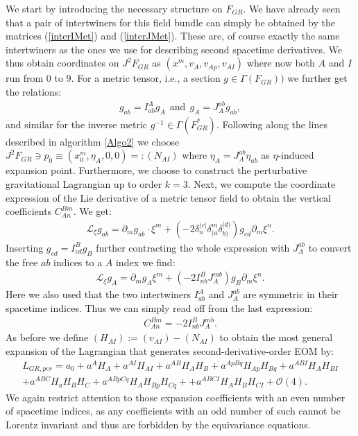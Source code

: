 We start by introducing the necessary structure on $F_{GR}$. We have already seen that a pair of intertwiners for this field bundle can simply be obtained by the matrices  (\ref{interIMet}) and (\ref{interJMet}). These are, of course exactly the same intertwiners as the ones we use for describing second spacetime derivatives. We thus obtain coordinates on $J^2F_{GR}$ as $(x^m,v_A,v_{Ap},v_{AI})$ where now both $A$ and $I$ run from 0 to 9. For a metric tensor, i.e., a section $g \in \Gamma(F_{GR}))$ we further get the relations:
\begin{align}
    g_{ab} = I^A _{ab} g_A \ \ \text{and} \ \ g_A = J^{ab}_{A} g_{ab},
\end{align}
and similar for the inverse metric $g^{-1} \in \Gamma(F_{GR}^{\ast})$.
Following along the lines described in algorithm \ref{Algo2} we choose $J^2F_{GR} \ni p_0 \equiv (x_0^m,\eta_A,0,0) =: (N_{AI})$ where $\eta_A = J^{ab}_A \eta_{ab}$ as $\eta$-induced expansion point. Furthermore, we choose to construct the perturbative gravitational Lagrangian up to order $k=3$. 
Next, we compute the coordinate expression of the Lie derivative of a metric tensor field to obtain the vertical coefficients $C_{An}^{Bm}$. We get:
\begin{align}
    \mathcal{L}_{\xi} g_{ab} = \partial_m g_{ab} \cdot \xi^m + \left (-2 \delta_n^{(c\vert} \delta_{(a}^m \delta_{b)}^{\vert d)} \right ) g_{cd} \partial_m \xi^n.
\end{align}
Inserting $g_{cd} = I^B_{cd} g_B$ further contracting the whole expression with $J^{ab}_A$ to convert the free $ab$ indices to a $A$ index we find:
\begin{align}
    \mathcal{L}_{\xi} g_A = \partial_m g_A \xi^m + \left (-2 I^B_{nb}J^{mb}_{A} \right )g_B \partial_m \xi ^n. 
\end{align}
Here we also used that the two intertwiners $I^A_{ab}$ and $J_A^{ab}$ are symmetric in their spacetime indices. Thus we can simply read off from the last expression:
\begin{align}
    C_{An}^{Bm} = -2 I^B_{nb}J_A^{mb}.
\end{align}
As before we define $(H_{AI}) := (v_{AI}) - (N_{AI})$ to obtain the most general expansion of the Lagrangian that generates second-derivative-order EOM by:
\begin{align}\label{LGR}
    L_{GR,per} =  a_0 + a^A H_A + a^{AI}H_{AI} + a^{AB} H_{A}H_{B} + a^{ApBq} H_{Ap}H_{Bq} + a^{ABI} H_{A} H_{BI} \\
    + a^{ABC} H_a H_B H_C + a^{ABpCq} H_{A}H_{Bp}H_{Cq} +
    + a^{ABCI} H_A H_B H_{CI} 
    + \mathcal{O}(4).
\end{align}
We again restrict attention to those expansion coefficients with an even number of spacetime indices, as any coefficients with an odd number of such cannot be Lorentz invariant and thus are forbidden by the equivariance equations.

